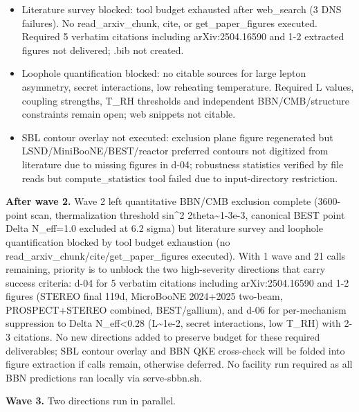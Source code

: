 \documentclass[11pt,a4paper]{article}
\begin{document}
\begin{itemize}
  \item Literature survey blocked: tool budget exhausted after web\_search (3 DNS failures). No read\_arxiv\_chunk, cite, or get\_paper\_figures executed. Required 5 verbatim citations including arXiv:2504.16590 and 1-2 extracted figures not delivered; .bib not created.
  \item Loophole quantification blocked: no citable sources for large lepton asymmetry, secret interactions, low reheating temperature. Required L values, coupling strengths, T\_RH thresholds and independent BBN/CMB/structure constraints remain open; web snippets not citable.
  \item SBL contour overlay not executed: exclusion plane figure regenerated but LSND/MiniBooNE/BEST/reactor preferred contours not digitized from literature due to missing figures in d-04; robustness statistics verified by file reads but compute\_statistics tool failed due to input-directory restriction.
\end{itemize}
\textbf{After wave 2.} Wave 2 left quantitative BBN/CMB exclusion complete (3600-point scan, thermalization threshold sin\textasciicircum{}2 2theta\textasciitilde{}1-3e-3, canonical BEST point Delta N\_eff=1.0 excluded at 6.2 sigma) but literature survey and loophole quantification blocked by tool budget exhaustion (no read\_arxiv\_chunk/cite/get\_paper\_figures executed). With 1 wave and 21 calls remaining, priority is to unblock the two high-severity directions that carry success criteria: d-04 for 5 verbatim citations including arXiv:2504.16590 and 1-2 figures (STEREO final 119d, MicroBooNE 2024+2025 two-beam, PROSPECT+STEREO combined, BEST/gallium), and d-06 for per-mechanism suppression to Delta N\_eff\textless{}0.28 (L\textasciitilde{}1e-2, secret interactions, low T\_RH) with 2-3 citations. No new directions added to preserve budget for these required deliverables; SBL contour overlay and BBN QKE cross-check will be folded into figure extraction if calls remain, otherwise deferred. No facility run required as all BBN predictions ran locally via serve-sbbn.sh.

\textbf{Wave 3.} Two directions run in parallel.
\end{document}
